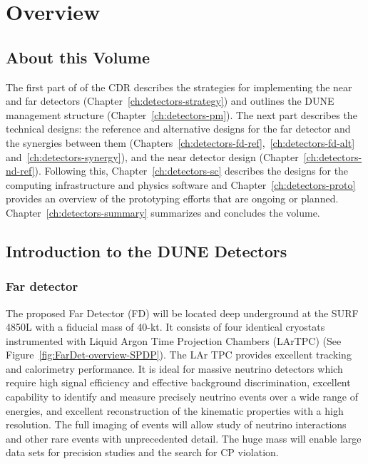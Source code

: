 \chapter{Overview}
\label{ch:detectors-overview}




\section{About this Volume}

The first part of \voldune of the CDR describes the strategies for
implementing the near and far detectors
(Chapter~\ref{ch:detectors-strategy}) and outlines the DUNE management
structure (Chapter~\ref{ch:detectors-pm}). The next part describes the
technical designs: the reference and alternative designs for the far
detector and the synergies between them
(Chapters~\ref{ch:detectors-fd-ref},~\ref{ch:detectors-fd-alt}
and~\ref{ch:detectors-synergy}), and the near detector design
(Chapter~\ref{ch:detectors-nd-ref}).  Following this,
Chapter~\ref{ch:detectors-sc} describes the designs for the computing
infrastructure and physics software and
Chapter~\ref{ch:detectors-proto} provides an overview of the
prototyping efforts that are ongoing or
planned. Chapter~\ref{ch:detectors-summary} summarizes and concludes
the volume.
 

\section{Introduction to the DUNE Detectors}
\label{sec:intro-dune-det}

\subsection{Far detector}
\label{sec:intro-dune-far-det}

The proposed Far Detector (FD) will be located deep underground at the
SURF 4850L with a fiducial mass of 40-kt. It consists of four
identical cryostats instrumented with Liquid Argon Time Projection
Chambers (LArTPC) (See Figure~\ref{fig:FarDet-overview-SPDP}). The LAr
TPC provides excellent tracking and calorimetry performance. It is
ideal for massive neutrino detectors which require high signal
efficiency and effective background discrimination, excellent
capability to identify and measure precisely neutrino events over a
wide range of energies, and excellent reconstruction of the kinematic
properties with a high resolution. The full imaging of events will
allow study of neutrino interactions and other rare events with
unprecedented detail. The huge mass will enable large data sets for
precision studies and the search for CP violation.

